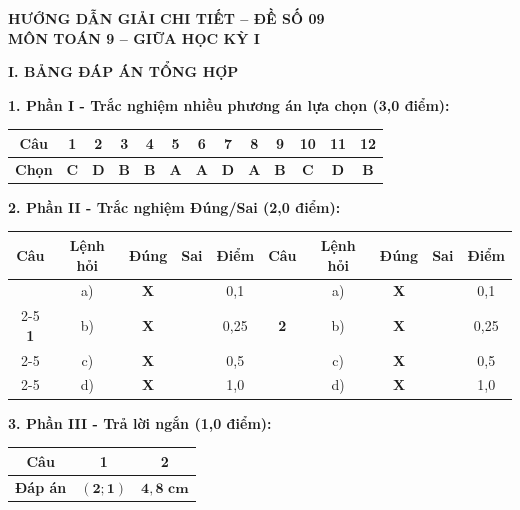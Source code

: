\documentclass[12pt,a4paper]{article}
\begin{document}
\begin{center}
  \textbf{\Large HƯỚNG DẪN GIẢI CHI TIẾT -- ĐỀ SỐ 09}\\
  \textbf{\large MÔN TOÁN 9 -- GIỮA HỌC KỲ I}
\end{center}
\vspace{2mm}

\noindent\textbf{\large I. BẢNG ĐÁP ÁN TỔNG HỢP}

\vspace{1mm}
\noindent\textbf{1. Phần I - Trắc nghiệm nhiều phương án lựa chọn (3,0 điểm):}
\begin{center}
\begin{tabular}{|c|c|c|c|c|c|c|c|c|c|c|c|c|}
\hline
\textbf{Câu} & \textbf{1} & \textbf{2} & \textbf{3} & \textbf{4} & \textbf{5} & \textbf{6} & \textbf{7} & \textbf{8} & \textbf{9} & \textbf{10} & \textbf{11} & \textbf{12} \\
\hline
\textbf{Chọn} & \textbf{C} & \textbf{D} & \textbf{B} & \textbf{B} & \textbf{A} & \textbf{A} & \textbf{D} & \textbf{A} & \textbf{B} & \textbf{C} & \textbf{D} & \textbf{B} \\
\hline
\end{tabular}
\end{center}
\vspace{1mm}

\noindent\textbf{2. Phần II - Trắc nghiệm Đúng/Sai (2,0 điểm):}
\begin{center}
\begin{tabular}{|c|c|c|c|c||c|c|c|c|c|}
\hline
\textbf{Câu} & \textbf{Lệnh hỏi} & \textbf{Đúng} & \textbf{Sai} & \textbf{Điểm} & \textbf{Câu} & \textbf{Lệnh hỏi} & \textbf{Đúng} & \textbf{Sai} & \textbf{Điểm} \\
\hline
 & a) & \textbf{X} & & 0,1 & & a) & \textbf{X} & & 0,1 \\
\cline{2-5}\cline{7-10}
\textbf{1} & b) & \textbf{X} & & 0,25 & \textbf{2} & b) & \textbf{X} & & 0,25 \\
\cline{2-5}\cline{7-10}
 & c) & \textbf{X} & & 0,5 & & c) & \textbf{X} & & 0,5 \\
\cline{2-5}\cline{7-10}
 & d) & \textbf{X} & & 1,0 & & d) & \textbf{X} & & 1,0 \\
\hline
\end{tabular}
\end{center}
\vspace{1mm}

\noindent\textbf{3. Phần III - Trả lời ngắn (1,0 điểm):}
\begin{center}
\begin{tabular}{|c|c|c|}
\hline
\textbf{Câu} & \textbf{1} & \textbf{2} \\
\hline
\textbf{Đáp án} & $\mathbf{(2; 1)}$ & $\mathbf{4{,}8\text{ cm}}$ \\
\hline
\end{tabular}
\end{center}
\vspace{3mm}
\end{document}
